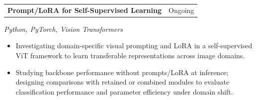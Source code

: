 \documentclass[letterpaper,10pt]{article}
\makeatletter
\newcommand{\entry}[2]{%
  \noindent
  \begin{tabularx}{\linewidth}
    {@{}>{\raggedright\arraybackslash}X@{\hspace{6pt}}r@{}}
    \textbf{#1} & #2
  \end{tabularx}\par
}
\newcommand{\bullets}{
  \begin{itemize}[
    leftmargin=1.2em,
    topsep=2pt,
    itemsep=1pt,
    parsep=0pt,
    partopsep=0pt
  ]
}
\newcommand{\finishbullets}{
  \end{itemize}
}
\makeatother
\begin{document}
\entry
  {Prompt/LoRA for Self-Supervised Learning}
  {Ongoing}

\textit{Python, PyTorch, Vision Transformers}

\bullets

  \item Investigating domain-specific visual prompting and LoRA
  in a self-supervised ViT framework to learn transferable
  representations across image domains.

  \item Studying backbone performance without prompts/LoRA at
  inference; designing comparisons with retained or combined modules
  to evaluate classification performance and parameter efficiency
  under domain shift.

\finishbullets
\end{document}
